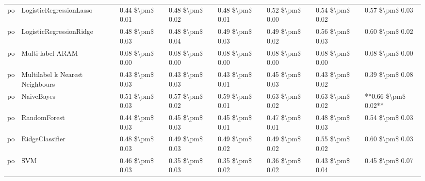\begin{tabular}{llllllll}
      po &         LogisticRegressionLasso & 0.44 \$\textbackslash pm\$ 0.01 &           0.48 \$\textbackslash pm\$ 0.02 &       0.48 \$\textbackslash pm\$ 0.01 &        0.52 \$\textbackslash pm\$ 0.00 &                         0.54 \$\textbackslash pm\$ 0.02 &     0.57 \$\textbackslash pm\$ 0.03 \\
      po &         LogisticRegressionRidge & 0.48 \$\textbackslash pm\$ 0.03 &           0.48 \$\textbackslash pm\$ 0.04 &       0.49 \$\textbackslash pm\$ 0.03 &        0.49 \$\textbackslash pm\$ 0.02 &                         0.56 \$\textbackslash pm\$ 0.03 &     0.60 \$\textbackslash pm\$ 0.02 \\
      po &                Multi-label ARAM & 0.08 \$\textbackslash pm\$ 0.00 &           0.08 \$\textbackslash pm\$ 0.00 &       0.08 \$\textbackslash pm\$ 0.00 &        0.08 \$\textbackslash pm\$ 0.00 &                         0.08 \$\textbackslash pm\$ 0.00 &     0.08 \$\textbackslash pm\$ 0.00 \\
      po & Multilabel k Nearest Neighbours & 0.43 \$\textbackslash pm\$ 0.03 &           0.43 \$\textbackslash pm\$ 0.03 &       0.43 \$\textbackslash pm\$ 0.01 &        0.45 \$\textbackslash pm\$ 0.03 &                         0.43 \$\textbackslash pm\$ 0.02 &     0.39 \$\textbackslash pm\$ 0.08 \\
      po &                      NaiveBayes & 0.51 \$\textbackslash pm\$ 0.03 &           0.57 \$\textbackslash pm\$ 0.02 &       0.59 \$\textbackslash pm\$ 0.01 &        0.63 \$\textbackslash pm\$ 0.02 &                         0.63 \$\textbackslash pm\$ 0.02 & **0.66 \$\textbackslash pm\$ 0.02** \\
      po &                    RandomForest & 0.44 \$\textbackslash pm\$ 0.03 &           0.45 \$\textbackslash pm\$ 0.03 &       0.45 \$\textbackslash pm\$ 0.01 &        0.47 \$\textbackslash pm\$ 0.01 &                         0.48 \$\textbackslash pm\$ 0.03 &     0.54 \$\textbackslash pm\$ 0.03 \\
      po &                 RidgeClassifier & 0.48 \$\textbackslash pm\$ 0.03 &           0.49 \$\textbackslash pm\$ 0.03 &       0.49 \$\textbackslash pm\$ 0.02 &        0.49 \$\textbackslash pm\$ 0.02 &                         0.55 \$\textbackslash pm\$ 0.02 &     0.60 \$\textbackslash pm\$ 0.03 \\
      po &                             SVM & 0.46 \$\textbackslash pm\$ 0.03 &           0.35 \$\textbackslash pm\$ 0.03 &       0.35 \$\textbackslash pm\$ 0.02 &        0.36 \$\textbackslash pm\$ 0.02 &                         0.43 \$\textbackslash pm\$ 0.04 &     0.45 \$\textbackslash pm\$ 0.07 \\

\end{tabular}
